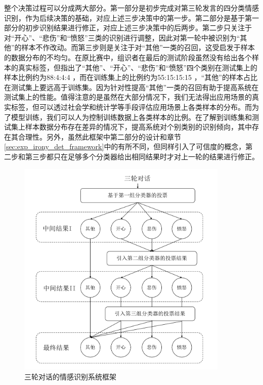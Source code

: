 整个决策过程可以分成两大部分。第一部分是初步完成对第三轮发言的四分类情感识别，作为后续决策的基础，对应上述三步决策中的第一步。第二部分是基于第一部分的初步识别结果进行修正，对应上述三步决策中的后两步。第二步只关注于对“开心”、“悲伤”和“愤怒”三类的识别进行调整，因此对第一轮中被识别为“其他”的样本不作改动。而第三步则是关注于对“其他”一类的召回，这受启发于样本的数据分布的不均匀。在原比赛中，组识者在最后的测试阶段虽然没有给出各个样本的真实标签，但指出了“其他”、“开心”、“悲伤”和“愤怒”四个类别在测试集上的样本比例约为88:4:4:4 ，而在训练集上的比例约为55:15:15:15 ，“其他”的样本占比在测试集上要远高于训练集。因为针对性提高“其他”一类的召回有助于提高系统在测试集上的性能。值得注意的是虽然在大部分情况下，我们无法得出应用场景的真实标签，但可以透过社会学和统计学等手段评估应用场景上各类样本的分布。而为了模型训练，我们可以人为控制训练数据上各类样本的比例。在了解到训练集和测试集上样本数据分布存在差异的情况下，提高系统对个别类别的识别倾向，其中存在其合理性。另外，虽然此框架中第二部分的设计和章节\ref{sec:exp_irony_det_framework}中的有所不同，但同样引入了可信度的概念，第二步和第三步都只在足够多个分类器给出相同结果时才对上一轮的结果进行修正。

\begin{figure}[H]
  \centering
  \includegraphics[width=0.9\textwidth]{img/context_emo_system.pdf}
  \caption{三轮对话的情感识别系统框架}
  \label{fig:context_emo_system}
\end{figure}

